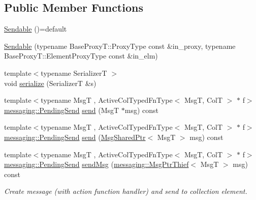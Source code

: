 \subsection*{Public Member Functions}
\begin{DoxyCompactItemize}
\item 
\hyperlink{structvt_1_1vrt_1_1collection_1_1_sendable_a26f7014b7bb14f0e4b758b5b076834f1}{Sendable} ()=default
\item 
\hyperlink{structvt_1_1vrt_1_1collection_1_1_sendable_aa4b3473480b076117715d1d21b53919b}{Sendable} (typename Base\+Proxy\+T\+::\+Proxy\+Type const \&in\+\_\+proxy, typename Base\+Proxy\+T\+::\+Element\+Proxy\+Type const \&in\+\_\+elm)
\item 
{\footnotesize template$<$typename SerializerT $>$ }\\void \hyperlink{structvt_1_1vrt_1_1collection_1_1_sendable_ae8e7cff31e30aa7cda6b958c1a81ddc3}{serialize} (SerializerT \&s)
\item 
{\footnotesize template$<$typename MsgT , Active\+Col\+Typed\+Fn\+Type$<$ Msg\+T, Col\+T $>$ $\ast$ f$>$ }\\\hyperlink{structvt_1_1messaging_1_1_pending_send}{messaging\+::\+Pending\+Send} \hyperlink{structvt_1_1vrt_1_1collection_1_1_sendable_a321d85ceafaf6525875fb7468a80ac6d}{send} (MsgT $\ast$msg) const
\item 
{\footnotesize template$<$typename MsgT , Active\+Col\+Typed\+Fn\+Type$<$ Msg\+T, Col\+T $>$ $\ast$ f$>$ }\\\hyperlink{structvt_1_1messaging_1_1_pending_send}{messaging\+::\+Pending\+Send} \hyperlink{structvt_1_1vrt_1_1collection_1_1_sendable_aa8c102820895d01422c14e8c0993fc90}{send} (\hyperlink{namespacevt_ab2b3d506ec8e8d1540aede826d84a239}{Msg\+Shared\+Ptr}$<$ MsgT $>$ msg) const
\item 
{\footnotesize template$<$typename MsgT , Active\+Col\+Typed\+Fn\+Type$<$ Msg\+T, Col\+T $>$ $\ast$ f$>$ }\\\hyperlink{structvt_1_1messaging_1_1_pending_send}{messaging\+::\+Pending\+Send} \hyperlink{structvt_1_1vrt_1_1collection_1_1_sendable_a1bae1b58a1ce80fd76ee43ff4d33905a}{send\+Msg} (\hyperlink{structvt_1_1messaging_1_1_msg_ptr_thief}{messaging\+::\+Msg\+Ptr\+Thief}$<$ MsgT $>$ msg) const
\begin{DoxyCompactList}\small\item\em Create message (with action function handler) and send to collection element. \end{DoxyCompactList}\item 

\end{DoxyCompactItemize}
